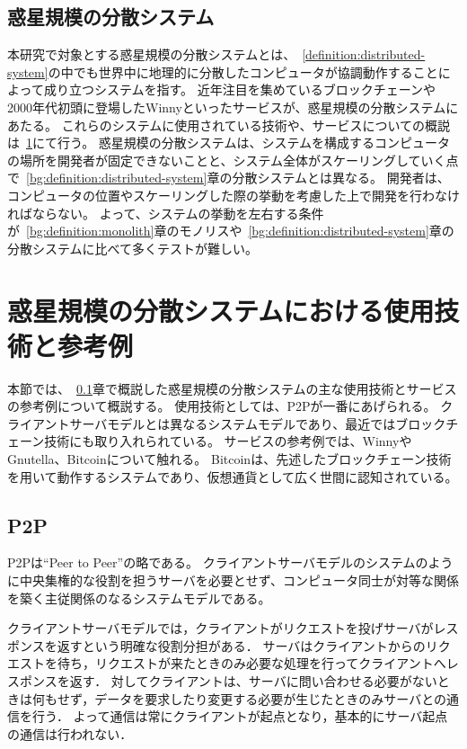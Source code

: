 \subsection{惑星規模の分散システム}
\label{bg:definition:planetary-scale-distributed-system}

本研究で対象とする惑星規模の分散システムとは、~\ref{definition:distributed-system}の中でも世界中に地理的に分散したコンピュータが協調動作することによって成り立つシステムを指す。
近年注目を集めているブロックチェーンや2000年代初頭に登場したWinnyといったサービスが、惑星規模の分散システムにあたる。
これらのシステムに使用されている技術や、サービスについての概説は~\ref{bg:planetary-scale-distributed-system}にて行う。
惑星規模の分散システムは、システムを構成するコンピュータの場所を開発者が固定できないことと、システム全体がスケーリングしていく点で~\ref{bg:definition:distributed-system}章の分散システムとは異なる。
開発者は、コンピュータの位置やスケーリングした際の挙動を考慮した上で開発を行わなければならない。
よって、システムの挙動を左右する条件が~\ref{bg:definition:monolith}章のモノリスや~\ref{bg:definition:distributed-system}章の分散システムに比べて多くテストが難しい。

\section{惑星規模の分散システムにおける使用技術と参考例}
\label{bg:planetary-scale-distributed-system}

本節では、~\ref{bg:definition:planetary-scale-distributed-system}章で概説した惑星規模の分散システムの主な使用技術とサービスの参考例について概説する。
使用技術としては、P2Pが一番にあげられる。
クライアントサーバモデルとは異なるシステムモデルであり、最近ではブロックチェーン技術にも取り入れられている。
サービスの参考例では、WinnyやGnutella、Bitcoinについて触れる。
Bitcoinは、先述したブロックチェーン技術を用いて動作するシステムであり、仮想通貨として広く世間に認知されている。

\subsection{P2P}
\label{bg:planetary-scale-distributed-system:p2p}

P2Pは``Peer to Peer''の略である。
クライアントサーバモデルのシステムのように中央集権的な役割を担うサーバを必要とせず、コンピュータ同士が対等な関係を築く主従関係のなるシステムモデルである。

クライアントサーバモデルでは，クライアントがリクエストを投げサーバがレスポンスを返すという明確な役割分担がある．
サーバはクライアントからのリクエストを待ち，リクエストが来たときのみ必要な処理を行ってクライアントへレスポンスを返す．
対してクライアントは、サーバに問い合わせる必要がないときは何もせず，データを要求したり変更する必要が生じたときのみサーバとの通信を行う．
よって通信は常にクライアントが起点となり，基本的にサーバ起点の通信は行われない．

